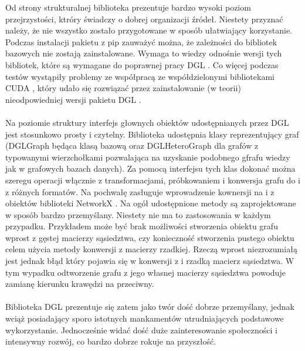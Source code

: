 \documentclass{article}
\begin{document}
 Od strony strukturalnej biblioteka prezentuje bardzo wysoki poziom przejrzystości, ktróry świadczy o dobrej organizacji źródeł. Niestety przyznać należy, że nie wszystko zostało przygotowane w sposób ułatwiający korzystanie. Podczas instalacji pakietu z pip zauważyć można, że zależności do bibliotek bazowych nie zostają zainstalowane. Wymaga to wiedzy odnośnie wersji tych bibliotek, które są wymagane do poprawnej pracy DGL \cite{dgl}. Co więcej podczas testów wystąpiły problemy ze współpracą ze współdzielonymi bibliotekami CUDA \cite{cuda}, który udało się rozwiązać przez zainstalowanie (w teorii) nieodpowiedniej wersji pakietu DGL \cite{dgl}.

 \paragraph{}
 Na poziomie struktury interfejs głownych obiektów udostępnianych przez DGL \cite{dgl} jest stosunkowo prosty i czytelny. Biblioteka udostępnia klasy reprezentujący graf (DGLGraph będąca klasą bazową oraz DGLHeteroGraph dla grafów z typowanymi wierzchołkami pozwalająca na uzyskanie podobnego gfrafu wiedzy jak w grafowych bazach danych). Za pomocą interfejsu tych klas dokonać można szeregu operacji włącznie z transformacjami, próbkowaniem i konwersja grafu do i z różnych formatów. Na pochwałę zasługuje wprowadzenie kownersji na i z obiektów biblioteki NetworkX \cite{nx}.  Na ogół udostępnione metody są zaprojektowane w sposób bardzo przemyślany. Niestety nie ma to zastosowania w każdym przypadku. Przykładem może być brak możliwości stworzenia obiektu grafu wprost z gęstej macierzy sąsiedztwa, czy konieczność stworzenia pustego obiektu celem użycia metody konwersji z macierzy rzadkiej. Rzeczą wprost niezrozumiałą jest jednak błąd który pojawia się w konwersji z i rzadką macierz sąsiedztwa. W tym wypadku odtworzenie grafu z jego własnej macierzy sąsiedztwa powoduje zamianę kierunku krawędzi na przeciwny.

\paragraph{}
Biblioteka DGL \cite{dgl} prezentuje się zatem jako twór dość dobrze przemyślany, jednak wciąż posiadający sporo istotnych mankamentów utrudniających podstawowe wykorzystanie. Jednocześnie widać dość duże zainteresowanie społeczności i intensywny rozwój, co bardzo dobrze rokuje na przyszłość.
\end{document}

